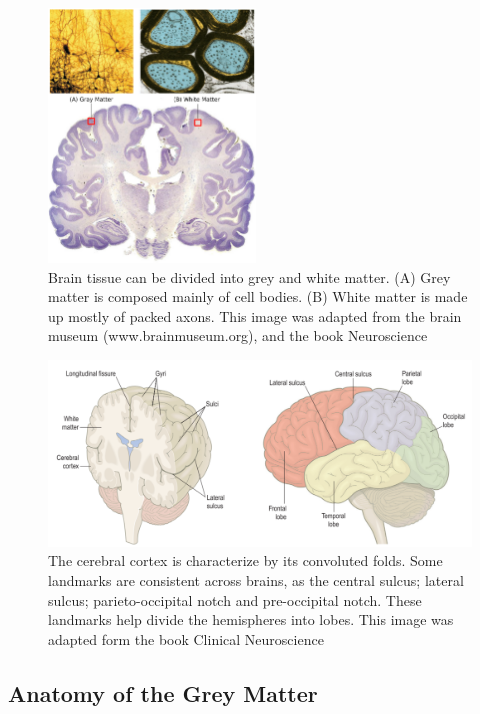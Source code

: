 \begin{figure}[t!]
    \includegraphics[width=0.49\textwidth]{2.neuroanatomy/img/white_vs_gray.png}
    \caption{Brain tissue can be divided into grey and white matter. (A) Grey matter
             is composed mainly of cell bodies. (B) White matter is made up mostly
             of packed axons. This image was adapted from the brain museum (www.brainmuseum.org),
             and the book Neuroscience\cite{Purves2004}}
    \label{fig:white_grey_matter}
\end{figure}

\begin{figure}[t]
    \includegraphics[width=\textwidth]{2.neuroanatomy/img/lobes.png}
    \caption{The cerebral cortex is characterize by its convoluted folds.
             Some landmarks are consistent across brains, as the central sulcus;
             lateral sulcus; parieto-occipital notch and pre-occipital notch.
             These landmarks help divide the hemispheres into lobes. This image
             was adapted form the book Clinical Neuroscience\cite{Johns}}
    \label{fig:cortex_anatomy}
\end{figure}

\subsection{Anatomy of the Grey Matter}

